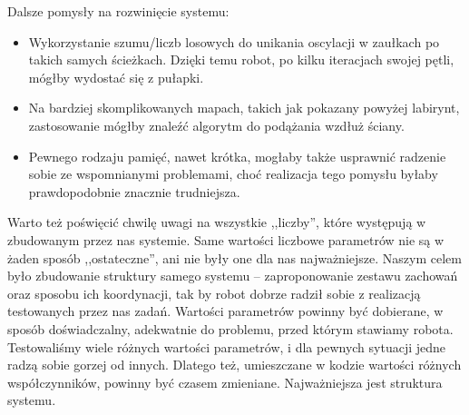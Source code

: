 \documentclass[11pt]{article}
\begin{document}
Dalsze pomysły na rozwinięcie systemu:
\begin{itemize}[--]
\item Wykorzystanie szumu/liczb losowych do unikania oscylacji w zaułkach po takich samych ścieżkach. Dzięki temu robot, po kilku iteracjach swojej pętli, mógłby wydostać się z pułapki.
\item Na bardziej skomplikowanych mapach, takich jak pokazany powyżej labirynt, zastosowanie mógłby znaleźć algorytm do podążania wzdłuż ściany.
\item Pewnego rodzaju pamięć, nawet krótka, mogłaby także usprawnić radzenie sobie ze wspomnianymi problemami, choć realizacja tego pomysłu byłaby prawdopodobnie znacznie trudniejsza.
\end{itemize}

Warto też poświęcić chwilę uwagi na wszystkie ,,liczby'', które występują w zbudowanym przez nas systemie. Same wartości liczbowe parametrów nie są w żaden sposób ,,ostateczne'', ani nie były one dla nas najważniejsze. Naszym celem było zbudowanie struktury samego systemu -- zaproponowanie zestawu zachowań oraz sposobu ich koordynacji, tak by robot dobrze radził sobie z realizacją testowanych przez nas zadań. Wartości parametrów powinny być dobierane, w sposób doświadczalny, adekwatnie do problemu, przed którym stawiamy robota. Testowaliśmy wiele różnych wartości parametrów, i dla pewnych sytuacji jedne radzą sobie gorzej od innych. Dlatego też, umieszczane w kodzie wartości różnych współczynników, powinny być czasem zmieniane. Najważniejsza jest struktura systemu.

\newpage
\end{document}
